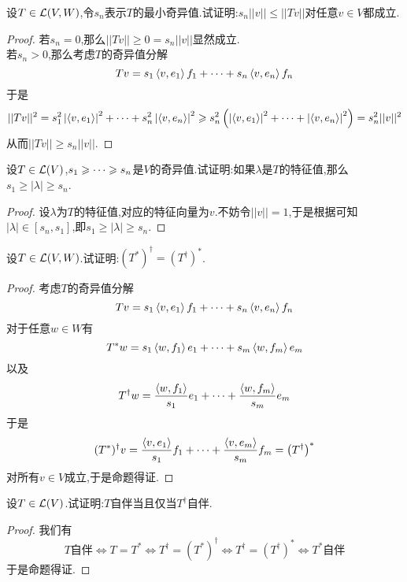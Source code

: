 \documentclass{ctexart}
\begin{document}
\begin{problem}[14.]
    设$T\in\mathcal{L}(V,W)$,令$s_n$表示$T$的最小奇异值.试证明:$s_n||v||\leqslant||Tv||$对任意$v\in V$都成立.
\end{problem}
\begin{proof}
    若$s_n=0$,那么$||Tv||\geqslant0=s_n||v||$显然成立.\\
    若$s_n>0$,那么考虑$T$的奇异值分解
    \[Tv=s_1\left\langle{v},{e_1}\right\rangle f_1+\cdots+s_n\left\langle{v},{e_n}\right\rangle f_n\]
    于是
    \[||Tv||^2=s_1^2\left|\left\langle{v},{e_1}\right\rangle\right|^2+\cdots+s_n^2\left|\left\langle{v},{e_n}\right\rangle\right|^2
    \geqslant s_n^2\left(\left|\left\langle{v},{e_1}\right\rangle\right|^2+\cdots+\left|\left\langle{v},{e_n}\right\rangle\right|^2\right)=s_n^2||v||^2\]
    从而$||Tv||\geqslant s_n||v||$.
\end{proof}
\begin{problem}[15.]
    设$T\in\mathcal{L}(V)$,${s}_1\geqslant\cdots\geqslant{s}_{n}$是$V$的奇异值.试证明:如果$\lambda$是$T$的特征值,那么$s_1\geqslant|\lambda|\geqslant s_n$.
\end{problem}
\begin{proof}
    设$\lambda$为$T$的特征值,对应的特征向量为$v$.不妨令$||v||=1$,于是根据可知$|\lambda|\in[s_n,s_1]$,即$s_1\geqslant|\lambda|\geqslant s_n$.
\end{proof}
\begin{problem}[16.]
    设$T\in\mathcal{L}(V,W)$.试证明:$\left(T^*\right)^\dagger=\left(T^\dagger\right)^*$.
\end{problem}
\begin{proof}
    考虑$T$的奇异值分解
    \[Tv=s_1\left\langle{v},{e_1}\right\rangle f_1+\cdots+s_n\left\langle{v},{e_n}\right\rangle f_n\]
    对于任意$w\in W$有
    \[T^*w=s_1\left\langle{w},{f_1}\right\rangle e_1+\cdots+s_m\left\langle{w},{f_m}\right\rangle e_m\]
    以及
    \[T^\dagger w=\dfrac{\left\langle{w},{f_1}\right\rangle}{s_1}e_1+\cdots+\dfrac{\left\langle{w},{f_m}\right\rangle}{s_m}e_m\]
    于是
    \[(T^*)^\dagger v=\dfrac{\left\langle{v},{e_1}\right\rangle}{s_1}f_1+\cdots+\dfrac{\left\langle{v},{e_m}\right\rangle}{s_m}f_m=\left(T^\dagger\right)^*\]
    对所有$v\in V$成立,于是命题得证.
\end{proof}
\begin{problem}[17.]
    设$T\in\mathcal{L}(V)$.试证明:$T$自伴当且仅当$T^\dagger$自伴.
\end{problem}
\begin{proof}
    我们有
    \[T\text{自伴}\Leftrightarrow T=T^*\Leftrightarrow T^\dagger=\left(T^*\right)^\dagger
    \Leftrightarrow T^\dagger=\left(T^\dagger\right)^*\Leftrightarrow T^*\text{自伴}\]
    于是命题得证.
\end{proof}
\end{document}
